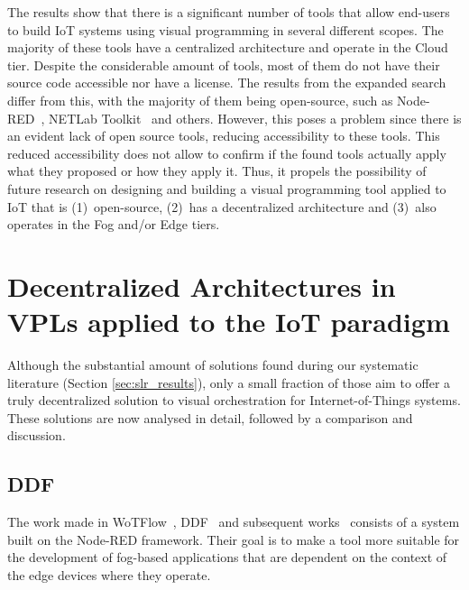 The results show that there is a significant number of tools that allow end-users to build IoT systems using visual programming in several different scopes. The majority of these tools have a centralized architecture and operate in the Cloud tier. Despite the considerable amount of tools, most of them do not have their source code accessible nor have a license. The results from the expanded search differ from this, with the majority of them being open-source, such as Node-RED~\cite{node_red}, NETLab Toolkit~\cite{netlabtoolkit} and others. However, this poses a problem since there is an evident lack of open source tools, reducing accessibility to these tools. This reduced accessibility does not allow to confirm if the found tools actually apply what they proposed or how they apply it. Thus, it propels the possibility of future research on designing and building a visual programming tool applied to IoT that is (1)~open-source, (2)~has a decentralized architecture and (3)~also operates in the Fog and/or Edge tiers.

\section{Decentralized Architectures in VPLs applied to the IoT paradigm}\label{sec:sota_decentralized}

Although the substantial amount of solutions found during our systematic literature (Section \ref{sec:slr_results}), only a small fraction of those aim to offer a truly decentralized solution to visual orchestration for Internet-of-Things systems. These solutions are now analysed in detail, followed by a comparison and discussion.

\subsection{DDF}\label{sec:decentralized_sota_ddf}

The work made in WoTFlow~\cite{wotflow_dnr}, DDF~\cite{ddf} and subsequent works~\cite{fog_at_the_edge,exogenous_coordination} consists of a system built on the Node-RED framework. Their goal is to make a tool more suitable for the development of fog-based applications that are dependent on the context of the edge devices where they operate. 

